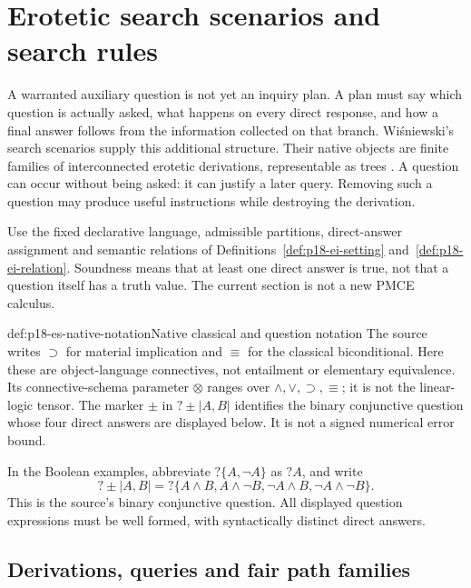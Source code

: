 \section{Erotetic search scenarios and search rules}
\label{sec:p18-erotetic-search-scenarios}

A warranted auxiliary question is not yet an inquiry plan. A plan must say
which question is actually asked, what happens on every direct response, and
how a final answer follows from the information collected on that branch.
Wi\'sniewski's search scenarios supply this additional structure. Their native
objects are finite families of interconnected erotetic derivations, representable
as trees \cite[secs.~9--10]{Wisniewski2001QuestionsInferences}. A question can
occur without being asked: it can justify a later query. Removing such a
question may produce useful instructions while destroying the derivation.

Use the fixed declarative language, admissible partitions, direct-answer
assignment and semantic relations of
Definitions~\ref{def:p18-ei-setting} and~\ref{def:p18-ei-relation}.
Soundness means that at least one direct answer is true, not that a question
itself has a truth value. The current section is not a new PMCE calculus.
\begin{hbconvention}{def:p18-es-native-notation}{Native classical and question notation}
The source writes \(\supset\) for material implication and \(\equiv\)
for the classical biconditional. Here these are object-language connectives,
not entailment or elementary equivalence. Its connective-schema parameter
\(\otimes\) ranges over \(\land,\lor,\supset,\equiv\); it is not the
linear-logic tensor. The marker \(\pm\) in \(?\pm|A,B|\) identifies the
binary conjunctive question whose four direct answers are displayed below.
It is not a signed numerical error bound.
\end{hbconvention}

In the Boolean examples, abbreviate \(?\{A,\neg A\}\) as \(?A\), and write
\[
 ?\pm|A,B|=?\{A\land B,A\land\neg B,
                         \neg A\land B,\neg A\land\neg B\}.
\]
This is the source's binary conjunctive question. All displayed question
expressions must be well formed, with syntactically distinct direct answers.

\subsection{Derivations, queries and fair path families}

